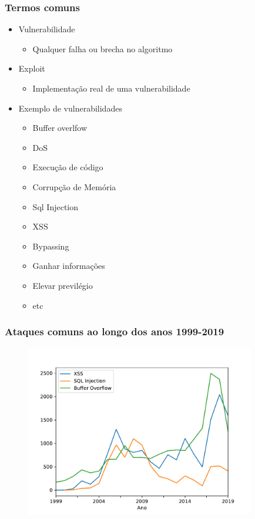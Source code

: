 \documentclass{beamer}
\begin{document}
\begin{frame}
	\frametitle{Termos comuns}
	
	\begin{itemize}
		\item Vulnerabilidade
		\begin{itemize}
			\item Qualquer falha ou brecha no algoritmo
		\end{itemize}
		\item Exploit
		\begin{itemize}
			\item Implementação real de uma vulnerabilidade
		\end{itemize}
		\item Exemplo de vulnerabilidades
		\begin{itemize}
			\item Buffer overlfow
			\item DoS
			\item Execução de código
			\item Corrupção de Memória
			\item Sql Injection
			\item XSS
			\item Bypassing
			\item Ganhar informações
			\item Elevar previlégio
			\item etc
		\end{itemize}
	\end{itemize}
\end{frame}
\begin{frame}
	\frametitle{Ataques comuns ao longo dos anos 1999-2019}
	\begin{figure}[htp]
			\includegraphics[width=10cm]{no_ataques.pdf}
		\end{figure}
\end{frame}
\end{document}
